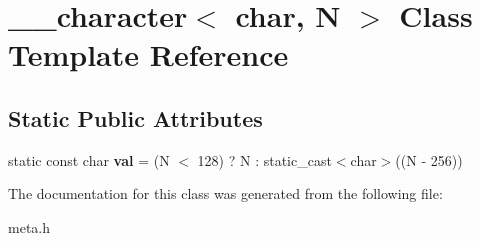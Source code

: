 \hypertarget{class____character_3_01char_00_01_n_01_4}{\section{\+\_\+\+\_\+character$<$ char, N $>$ Class Template Reference}
\label{class____character_3_01char_00_01_n_01_4}
}
\subsection*{Static Public Attributes}
\begin{DoxyCompactItemize}
\item 
\hypertarget{class____character_3_01char_00_01_n_01_4_ac59bbe8b325f0733e25866eb9f7d63d1}{static const char {\bfseries val} = (N $<$ 128) ? N \+: static\+\_\+cast$<$char$>$((N -\/ 256))}\label{class____character_3_01char_00_01_n_01_4_ac59bbe8b325f0733e25866eb9f7d63d1}

\end{DoxyCompactItemize}


The documentation for this class was generated from the following file\+:\begin{DoxyCompactItemize}
\item 
meta.\+h\end{DoxyCompactItemize}
